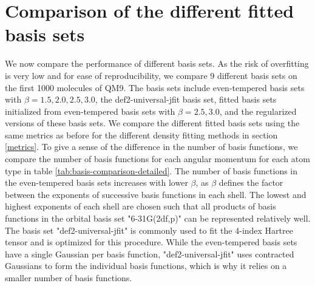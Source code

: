 \section{Comparison of the different fitted basis sets}
We now compare the performance of different basis sets. As the risk of overfitting is very low and for ease of reproducibility, we compare 9 different basis sets on the first 1000 molecules of QM9. The basis sets include even-tempered basis sets with $\beta = 1.5,2.0,2.5,3.0$, the def2-universal-jfit basis set, fitted basis sets initialized from even-tempered basis sets with $\beta = 2.5,3.0$, and the regularized versions of these basis sets. We compare the different fitted basis sets using the same metrics as before for the different density fitting methods in section \ref{metrics}. To give a sense of the difference in the number of basis functions, we compare the number of basis functions for each angular momentum for each atom type in table \ref{tab:basis-comparison-detailed}. The number of basis functions in the even-tempered basis sets increases with lower $\beta$, as $\beta$ defines the factor between the exponents of successive basis functions in each shell. The lowest and highest exponents of each shell are chosen such that all products of basis functions in the orbital basis set "6-31G(2df,p)" can be represented relatively well. The basis set "def2-universal-jfit" is commonly used to fit the 4-index Hartree tensor and is optimized for this procedure. While the even-tempered basis sets have a single Gaussian per basis function, "def2-universal-jfit" uses contracted Gaussians to form the individual basis functions, which is why it relies on a smaller number of basis functions.\\
